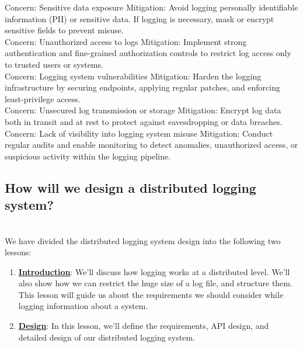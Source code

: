 Concern: Sensitive data exposure Mitigation: Avoid logging personally identifiable information (PII) or sensitive data. If logging is necessary, mask or encrypt sensitive fields to prevent misuse.
\\
Concern: Unauthorized access to logs Mitigation: Implement strong authentication and fine-grained authorization controls to restrict log access only to trusted users or systems.
\\
Concern: Logging system vulnerabilities Mitigation: Harden the logging infrastructure by securing endpoints, applying regular patches, and enforcing least-privilege access.
\\
Concern: Unsecured log transmission or storage Mitigation: Encrypt log data both in transit and at rest to protect against eavesdropping or data breaches.
\\
Concern: Lack of visibility into logging system misuse Mitigation: Conduct regular audits and enable monitoring to detect anomalies, unauthorized access, or suspicious activity within the logging pipeline.

\subsection{How will we design a distributed logging system?}\label{6FBys8A3TarKhwr5TDugN}
\\
We have divided the distributed logging system design into the following two lessons:

\begin{enumerate}
\item
\protect{}\label{CbO9xxSOz7hMrRlvLwqgq}
\href{https://www.educative.io/courses/grokking-the-system-design-interview/introduction-to-distributed-logging}{\textbf{Introduction}}: We'll discuss how logging works at a distributed level. We'll also show how we can restrict the huge size of a log file, and structure them. This lesson will guide us about the requirements we should consider while logging information about a system.
\item
\protect{}\label{92-23NUG5JJ4TOp6aod0k}
\href{https://www.educative.io/courses/grokking-the-system-design-interview/design-of-a-distributed-logging-service}{\textbf{Design}}: In this lesson, we'll define the requirements, API design, and detailed design of our distributed logging system.
\end{enumerate}

